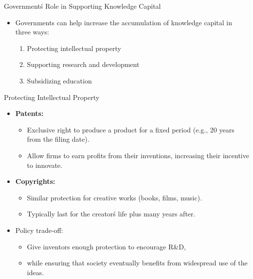 \documentclass[aspectratio=169]{beamer}
\begin{document}
\begin{frame}{Government\'s Role in Supporting Knowledge Capital}
\transfade
\begin{itemize}[<+->]
  \item Governments can help increase the accumulation of knowledge capital in three ways:
  \begin{enumerate}[<+->]
    \item Protecting intellectual property
    \item Supporting research and development
    \item Subsidizing education
  \end{enumerate}
\end{itemize}
\end{frame}

\begin{frame}{Protecting Intellectual Property}
\transfade
\begin{itemize}[<+->]
  \item \textbf{Patents:}
  \begin{itemize}[<+->]
    \item Exclusive right to produce a product for a fixed period (e.g., 20 years from the filing date).
    \item Allow firms to earn profits from their inventions, increasing their incentive to innovate.
  \end{itemize}
  \item \textbf{Copyrights:}
  \begin{itemize}[<+->]
    \item Similar protection for creative works (books, films, music).
    \item Typically last for the creator\'s life plus many years after.
  \end{itemize}
  \item Policy trade-off:
  \begin{itemize}[<+->]
    \item Give inventors enough protection to encourage R\&D,
    \item while ensuring that society eventually benefits from widespread use of the ideas.
  \end{itemize}
\end{itemize}
\end{frame}
\end{document}

